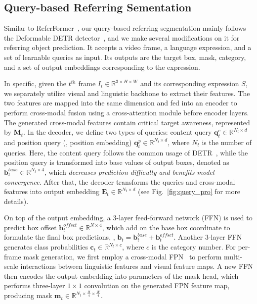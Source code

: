 \documentclass[10pt,twocolumn,letterpaper]{article}
\begin{document}
\subsection{Query-based Referring  Sementation}
\label{sec:query-based referring segmentation}



Similar to ReferFormer~\cite{referformer}, our query-based referring segmentation mainly follows the Deformable DETR detector~\cite{deformable}, and we make several modifications on it for referring object prediction.
It accepts a video frame, a language expression, and a set of learnable queries as input. Its outputs are the target box, mask, category, and a set of output embeddings corresponding to the expression.



In specific,  given the  $t^{th}$ frame $I_t \! \in \!\mathbb{R}^{3 \times H \times W}$ and its corresponding expression $S$, we separately utilize visual and linguistic backbone to extract their features.
The two features are mapped into the same dimension and fed into an encoder to perform cross-modal fusion using a cross-attention module before encoder layers.
The generated cross-modal features contain critical target awareness, represented by $\bm{M}_t$.
In the decoder, we define two types of queries: content query $\bm{q}_t^c \!\in\! \mathbb{R}^{N_t\times d}$  and position query (\ie, position embedding) $\bm{q}_t^p \!\in\! \mathbb{R}^{N_t\times d}$,  where $N_t$ is the number of queries.
Here, the content query follows the common usage of DETR~\cite{detr}, while the position query is transformed into base values of output boxes, denoted as $\bm{b}^{base}_t\!\in\! \mathbb{R}^{N_t\times 4}$, which \textit{decreases prediction difficulty and benefits model convergence}.
After that, the decoder transforms the queries and cross-modal features into output embedding $\bm{E}_t\!\in\! \mathbb{R}^{N_t\times d}$ (see Fig.~\ref{fig:query_pro} for more details).


On top of the output embedding, a 3-layer feed-forward network (FFN) is used to predict box offset $\bm{b}^{offset}_t\!\in\! \mathbb{R}^{N\times 4}$, which add on the base box coordinate to formulate the final box predictions, \ie, $\bm{b}_t\!=\!\bm{b}^{base}_t\! +\bm{b}^{offset}_t$.
Another 3-layer FFN generates class probabilities $\bm{c}_t\!\in\! \mathbb{R}^{N_t\times c}$, where $c$ is the category number.
For per-frame mask generation, we first employ a cross-modal FPN~\cite{referformer} to perform multi-scale interactions between linguistic features and visual feature maps.
A new FFN then encodes the output embedding into parameters of the mask head, which performs three-layer $1\!\times\! 1$ convolution on the generated FPN feature map, producing mask $\bm{m}_t\!\in \! \mathbb{R}^{N_t\times \frac{H}{4} \times \frac{W}{4}}$.
\end{document}

